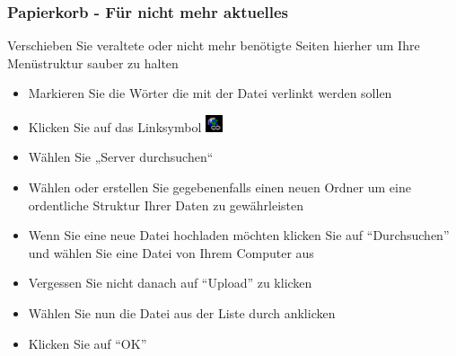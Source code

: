 \documentclass[article, a4paper, oneside, 11pt]{memoir}
\begin{document}
\subsubsection{Papierkorb - Für nicht mehr aktuelles}

Verschieben Sie veraltete oder nicht mehr benötigte Seiten hierher um Ihre Menüstruktur sauber zu halten



\begin{itemize}
\item Markieren Sie die Wörter die mit der Datei verlinkt werden sollen
\item Klicken Sie auf das Linksymbol \includegraphics[height=5mm]{link_icon}
\item Wählen Sie „Server durchsuchen“
\item Wählen oder erstellen Sie gegebenenfalls einen neuen Ordner um eine ordentliche Struktur Ihrer Daten zu gewährleisten
\item Wenn Sie eine neue Datei hochladen möchten klicken Sie auf "`Durchsuchen"' und wählen Sie eine Datei von Ihrem Computer aus
\item Vergessen Sie nicht danach auf "`Upload"' zu klicken
\item Wählen Sie nun die Datei aus der Liste durch anklicken
\item Klicken Sie auf "`OK"'
\end{itemize}
\end{document}

